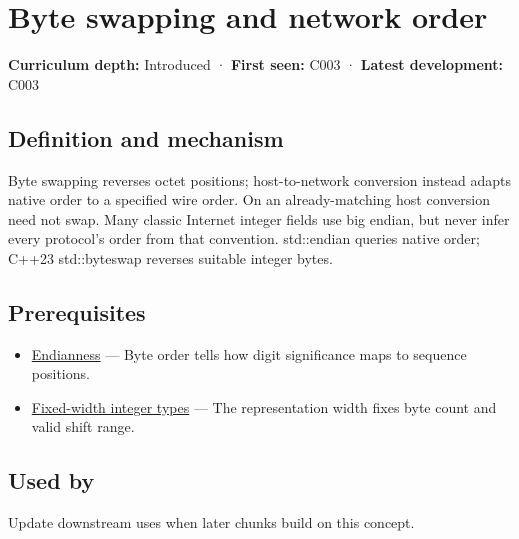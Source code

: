 \hypertarget{appendix-11ba36693aa2}{}\label{referencestart:appendix-11ba36693aa2}
\section{Byte swapping and network order}\label{appendix-11ba36693aa2-byte-swapping-and-network-order}

\textbf{Curriculum depth:} Introduced · \textbf{First seen:} C003 · \textbf{Latest development:} C003

\begin{allmightroledefinition}

\subsection{Definition and mechanism}\label{appendix-11ba36693aa2-definition-and-mechanism}

Byte swapping reverses octet positions; host-to-network conversion instead adapts native order to a specified wire order. On an already-matching host conversion need not swap. Many classic Internet integer fields use big endian, but never infer every protocol's order from that convention. std::endian queries native order; C++23 std::byteswap reverses suitable integer bytes.

\end{allmightroledefinition}

\subsection{Prerequisites}\label{appendix-11ba36693aa2-prerequisites}

\begin{itemize}
\tightlist
\item
  \hyperref[appendix-bc07c3d25b18]{Endianness} --- Byte order tells how digit significance maps to sequence positions.
\item
  \hyperref[appendix-cc04044b5782]{Fixed-width integer types} --- The representation width fixes byte count and valid shift range.
\end{itemize}

\subsection{Used by}\label{appendix-11ba36693aa2-used-by}

Update downstream uses when later chunks build on this concept.

